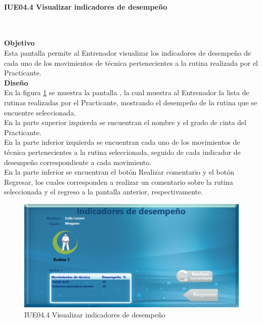 \paragraph{IUE04.4 Visualizar indicadores de desempeño} \hspace{1cm}\\ 
\label{pant:IUE04.4} 

\textbf{\textcolor[rgb]{0, 0, 0.545098}{Objetivo}}\\
Esta pantalla permite al Entrenador visualizar los indicadores de desempeño de cada uno de los movimientos de técnica pertenecientes a la rutina realizada por el Practicante.\\

\textbf{\textcolor[rgb]{0, 0, 0.545098}{Diseño}}\\
En la figura \ref{fig:IUE04.4} se muestra la pantalla , la cual muestra al Entrenador la lista de rutinas realizadas por el Practicante, mostrando el desempeño de la rutina que se encuentre seleccionada.\\

En la parte superior izquierda se encuentran el nombre y el grado de cinta del Practicante.\\

En la parte inferior izquierda se encuentran cada uno de los movimientos de técnica pertenecientes a la rutina seleccionada, seguido de cada indicador de desempeño correspondiente a cada movimiento.\\

En la parte inferior se encuentran el botón Realizar comentario y el botón Regresar, los cuales corresponden a realizar un comentario sobre la rutina seleccionada y el regreso a la pantalla anterior, respectivamente.\\

\begin{figure}[H]
	\centering
		\includegraphics[scale=0.5]{./Figuras/Pantallas/IUE04_4Visualizar_indicadores_de_desempeno}
	\caption{IUE04.4 Visualizar indicadores de desempeño}
	\label{fig:IUE04.4}
\end{figure}

